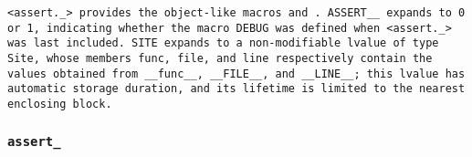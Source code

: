 \tt{<assert._>} provides the object-like macros  and .
\tt{ASSERT__} expands to \tt{0} or \tt{1}, indicating whether the
macro \tt{DEBUG} was defined when \tt{<assert._>} was last included.
\tt{SITE} expands to a non-modifiable lvalue of type \tt{Site}, whose members
\tt{func}, \tt{file}, and \tt{line} respectively contain the values obtained
from \tt{__func__}, \tt{__FILE__}, and \tt{__LINE__}; this lvalue has automatic
storage duration, and its lifetime is limited to the nearest enclosing block.

\subsubsection{\tt{assert_}}


